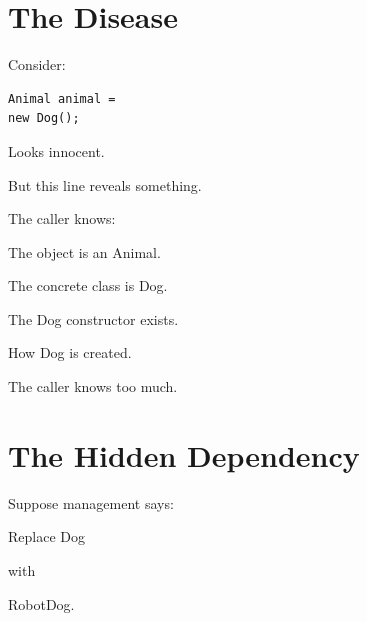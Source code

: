 \documentclass[11pt,a4paper]{book}
\begin{document}
\section{The Disease}

Consider:

\begin{verbatim}
Animal animal =
new Dog();
\end{verbatim}

Looks innocent.


But this line reveals something.


The caller knows:


The object is an Animal.


The concrete class is Dog.


The Dog constructor exists.


How Dog is created.


The caller knows too much.


\section{The Hidden Dependency}

Suppose management says:


Replace Dog

with

RobotDog.

\end{document}
